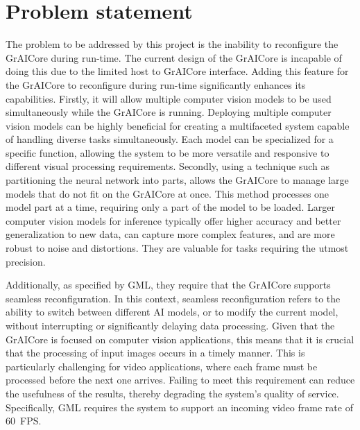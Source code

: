 \section{Problem statement}

The problem to be addressed by this project is the inability to reconfigure the GrAICore during run-time.
The current design of the GrAICore is incapable of doing this due to the limited host to GrAICore interface.
Adding this feature for the GrAICore to reconfigure during run-time significantly enhances its capabilities.
Firstly, it will allow multiple computer vision models to be used simultaneously while the GrAICore is running.
Deploying multiple computer vision models can be highly beneficial for creating a multifaceted system capable of handling diverse tasks simultaneously.
Each model can be specialized for a specific function, allowing the system to be more versatile and responsive to different visual processing requirements.
Secondly, using a technique such as partitioning the neural network into parts, allows the GrAICore to manage large models that do not fit on the GrAICore at once.
This method processes one model part at a time, requiring only a part of the model to be loaded.
Larger computer vision models for inference typically offer higher accuracy and better generalization to new data, can capture more complex features, and are more robust to noise and distortions.
They are valuable for tasks requiring the utmost precision.

Additionally, as specified by GML, they require that the GrAICore supports seamless reconfiguration.
In this context, seamless reconfiguration refers to the ability to switch between different AI models, or to modify the current model, without interrupting or significantly delaying data processing.
Given that the GrAICore is focused on computer vision applications, this means that it is crucial that the processing of input images occurs in a timely manner.
This is particularly challenging for video applications, where each frame must be processed before the next one arrives. Failing to meet this requirement can reduce the usefulness of the results, thereby degrading the system's quality of service.
Specifically, GML requires the system to support an incoming video frame rate of \SI{60}{FPS}.
